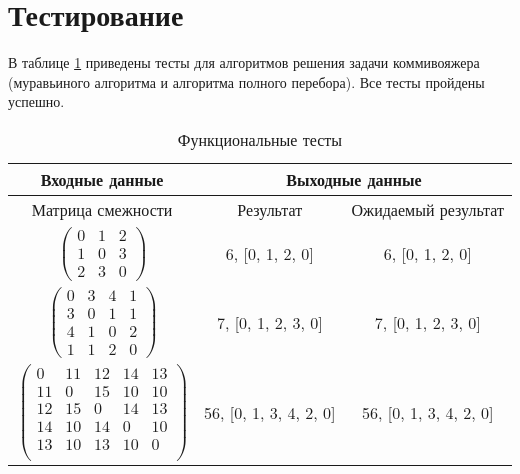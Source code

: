 \section{Тестирование}

В таблице \ref{tbl:functional_test} приведены тесты для алгоритмов решения задачи коммивояжера (муравьиного алгоритма и алгоритма полного перебора). Все тесты пройдены успешно.

\begin{table}[h]
	\begin{center}
        \begin{threeparttable}
        \captionsetup{justification=raggedright,singlelinecheck=off}
		\caption{\label{tbl:functional_test} Функциональные тесты}
		\begin{tabular}{|c|c|c|}
            \hline
        	Входные данные& \multicolumn{2}{c|}{Выходные данные}
        	\\ \hline
        	Матрица смежности & Результат & Ожидаемый результат 
        	\\ \hline
        	$\begin{pmatrix}
        		0 & 1 & 2\\
        		1 & 0 & 3\\
        		2 & 3 & 0
        	\end{pmatrix}$ & 6, [0, 1, 2, 0] & 6, [0, 1, 2, 0]
        	\\ \hline
        	$\begin{pmatrix}
        		0 & 3 & 4 & 1\\
        		3 & 0 & 1 & 1\\
        		4 & 1 & 0 & 2\\
        		1 & 1 & 2 & 0
        	\end{pmatrix}$ & 7, [0, 1, 2, 3, 0] & 7, [0, 1, 2, 3, 0]
        	\\ \hline
        	$\begin{pmatrix}
        		0 & 11 & 12 & 14 & 13\\
        		11 & 0 & 15 & 10 & 10\\
        		12 & 15 & 0 & 14 & 13\\
        		14 & 10 & 14 & 0 & 10\\
        		13 & 10 & 13 & 10 & 0\\
        	\end{pmatrix}$ & 56, [0, 1, 3, 4, 2, 0] & 56, [0, 1, 3, 4, 2, 0]
        	\\ \hline
		\end{tabular}
        \end{threeparttable}
	\end{center}
\end{table}

